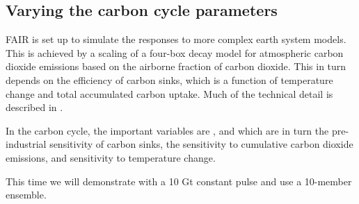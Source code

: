 \documentclass[letterpaper,10pt,english]{sphinxmanual}
\begin{document}
\subsection{Varying the carbon cycle parameters}
\label{\detokenize{examples:varying-the-carbon-cycle-parameters}}
FAIR is set up to simulate the responses to more complex earth system
models. This is achieved by a scaling of a four-box decay model for
atmospheric carbon dioxide emissions based on the airborne fraction of
carbon dioxide. This in turn depends on the efficiency of carbon sinks,
which is a function of temperature change and total accumulated carbon
uptake. Much of the technical detail is described in .

In the carbon cycle, the important variables are ,  and
 which are in turn the pre-industrial sensitivity of carbon sinks,
the sensitivity to cumulative carbon dioxide emissions, and sensitivity
to temperature change.

This time we will demonstrate with a 10 Gt constant pulse and use a
10-member ensemble.
\end{document}
